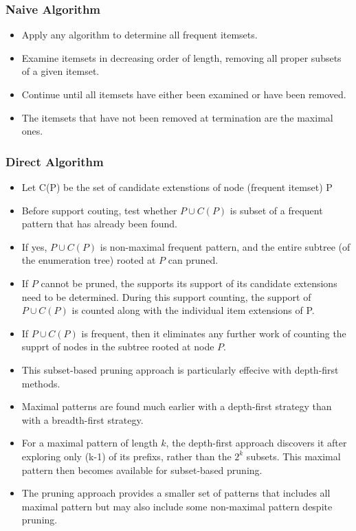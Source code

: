 \documentclass{article}
\begin{document}
\subsubsection{Naive Algorithm}
\begin{itemize} 
  \item Apply any algorithm to determine all frequent itemsets.
  \item Examine itemsets in decreasing order of length, removing all proper subsets of a given itemset.
  \item Continue until all itemsets have either been examined or have been removed.
  \item The itemsets that have not been removed at termination are the maximal ones.
\end{itemize}

\subsubsection{Direct Algorithm}
\begin{itemize} 
  \item Let C(P) be the set of candidate extenstions of node (frequent itemset) P
  \item Before support couting, test whether $P \cup C(P)$ is subset of a frequent pattern that has already been found.
  \item If yes, $P \cup C(P)$ is non-maximal frequent pattern, and the entire subtree (of the enumeration tree) rooted at $P$ can pruned.
  \item If $P$ cannot be pruned, the supports its support of its candidate extensions need to be determined. During this support counting, the support of $P \cup C(P)$ is counted along with the individual item extensions of P.
  \item If $P \cup C(P)$ is frequent, then it eliminates any further work of counting the supprt of nodes in the subtree rooted at node $P$.
  \item This subset-based pruning approach is particularly effecive with depth-first methods.
  \item Maximal patterns are found much earlier with a depth-first strategy than with a breadth-first strategy.
  \item For a maximal pattern of length $k$, the depth-first approach discovers it after exploring only (k-1) of its prefixs, rather than the $2^k$ subsets. This maximal pattern then becomes available for subset-based pruning.
  \item The pruning approach provides a smaller set of patterns that includes all maximal pattern but may also include some non-maximal pattern despite pruning.
\end{itemize}
\end{document}
